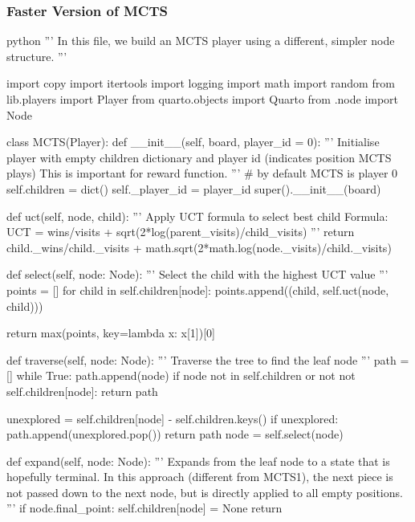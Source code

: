 \subsubsection{Faster Version of MCTS}

\begin{mintedbox}{python}
'''
In this file, we build an MCTS player using a different, simpler node structure.
'''

import copy
import itertools
import logging
import math
import random
from lib.players import Player
from quarto.objects import Quarto
from .node import Node


class MCTS(Player):
    def __init__(self, board, player_id = 0):
        '''
        Initialise player with empty children dictionary
        and player id (indicates position MCTS plays)
        This is important for reward function.
        '''
        # by default MCTS is player 0
        self.children = dict()
        self._player_id = player_id
        super().__init__(board)

    def uct(self, node, child):
        '''
        Apply UCT formula to select best child
        Formula: UCT = wins/visits + sqrt(2*log(parent_visits)/child_visits)
        '''
        return child._wins/child._visits + math.sqrt(2*math.log(node._visits)/child._visits)

    def select(self, node: Node):
        '''
        Select the child with the highest UCT value
        '''
        points = []
        for child in self.children[node]:
            points.append((child, self.uct(node, child)))

        return max(points, key=lambda x: x[1])[0]

    def traverse(self, node: Node):
        '''
        Traverse the tree to find the leaf node
        '''
        path = []
        while True:
            path.append(node)
            if node not in self.children or not not self.children[node]:
                return path

            unexplored = self.children[node] - self.children.keys()
            if unexplored:
                path.append(unexplored.pop())
                return path
            node = self.select(node)

    def expand(self, node: Node):
        '''
        Expands from the leaf node to a state that is hopefully terminal. In this approach (different from MCTS1), the next piece is not passed down to the next node, but is directly applied to all empty positions.
        '''
        if node.final_point:
            self.children[node] = None
            return


\end{mintedbox}
